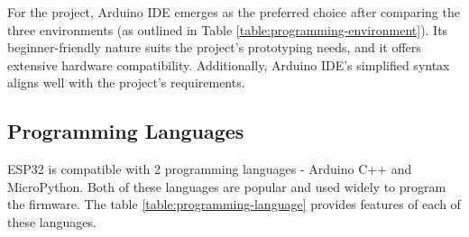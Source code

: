 For the project, Arduino IDE emerges as the preferred choice after comparing the three environments (as outlined in Table \ref{table:programming-environment}). Its beginner-friendly nature suits the project's prototyping needs, and it offers extensive hardware compatibility. Additionally, Arduino IDE's simplified syntax aligns well with the project's requirements.

\subsection{Programming Languages}
ESP32 is compatible with 2 programming languages - Arduino C++ and MicroPython. Both of these languages are popular and used widely to program the firmware. The table \ref{table:programming-language} provides features of each of these languages.


